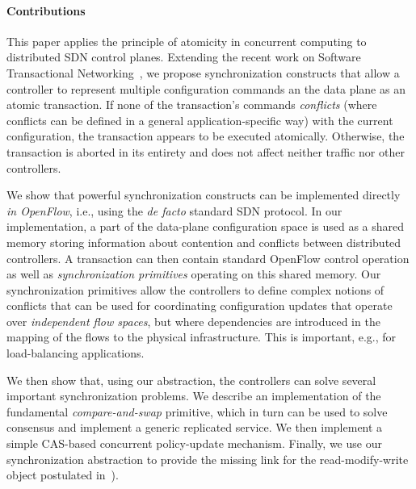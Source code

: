 \documentclass[conference]{sigcomm-alternate}
\newcommand{\petr}[1]{\textit{\textcolor{blue}{[petr]: #1}}} %
\begin{document}
\paragraph{Contributions}
This paper applies the principle of atomicity in concurrent computing
to distributed SDN control planes. 
%
Extending the recent work on Software Transactional
Networking~\cite{stn}, we propose synchronization constructs that
allow a controller to represent multiple configuration commands an
the data plane as an atomic transaction. 
%
If none of the transaction's commands \emph{conflicts} (where conflicts can be
defined in a general application-specific way) with the current
configuration, the transaction appears to be executed atomically.
Otherwise, the transaction is aborted in its entirety and does not
affect neither traffic nor other controllers.      



We show that powerful synchronization constructs can be implemented
directly \emph{in OpenFlow}, i.e., using the \emph{de facto} standard SDN
protocol. 
In our implementation, a part of the data-plane configuration space is
used as a shared memory storing information about  contention and
conflicts between distributed controllers.
A transaction can then contain standard OpenFlow control operation
as well as  \emph{synchronization primitives} operating on this shared
memory. 
Our synchronization primitives allow the controllers to define complex notions
of conflicts that can be used for coordinating configuration updates that
operate over \emph{independent flow spaces}, but where dependencies are introduced
in the mapping of the flows to the physical infrastructure. This is
important, e.g., for load-balancing applications.


We then show that, using our abstraction, the controllers can 
solve several important synchronization problems. 
We describe an implementation of the fundamental \emph{compare-and-swap} primitive, 
which in turn can be used to solve consensus and
implement a generic replicated service.
We then implement a simple CAS-based concurrent policy-update mechanism. 
Finally, we use our synchronization abstraction to provide
the missing link for the read-modify-write object
postulated in~\cite{cpc}).
\end{document}

